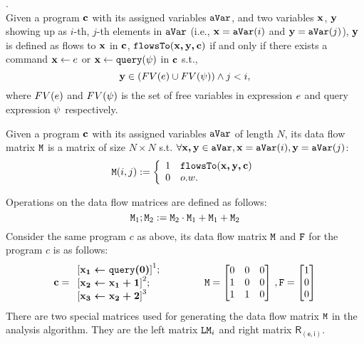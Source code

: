 \documentclass[a4paper,11pt]{article}
\begin{document}
\begin{defn}.
\\
Given a program  ${\boldsymbol{\mathbf{c}}}$ with its assigned variables $\mathtt{aVar}$,
and two variables ${\boldsymbol{\mathbf{x}}}$, ${\boldsymbol{\mathbf{y}}}$ showing up as $i$-th, $j$-th elements in $\mathtt{aVar}$ 
(i.e., ${\boldsymbol{\mathbf{x}}} = \mathtt{aVar}(i)$ and ${\boldsymbol{\mathbf{y}}} = \mathtt{aVar}(j)$),
${\boldsymbol{\mathbf{y}}}$ is defined as flows to ${\boldsymbol{\mathbf{x}}}$ in ${\boldsymbol{\mathbf{c}}}$, $\mathtt{flowsTo}({\boldsymbol{\mathbf{x, y, c}}})$ if and only if 
there exists
a command $\mathrel{ {\boldsymbol{\mathbf{x}}} \leftarrow e }$ or $\mathrel{ {\boldsymbol{\mathbf{x}}} \leftarrow {\tt query}(\psi) }$ in ${\boldsymbol{\mathbf{c}}}$ s.t.,
\[
	{\boldsymbol{\mathbf{y}}} \in (FV(e) \cup FV(\psi)) \land j < i,
\]
where $FV(e)$ and $FV(\psi)$ is the set of free variables in 
expression $e$ and query expression $\psi$ respectively.
\end{defn}
%
%
\begin{defn}
Given a program  ${\boldsymbol{\mathbf{c}}}$ with its assigned variables $\mathtt{aVar}$ of length $N$,
its data flow matrix $\mathtt{M}$ is a matrix of size $N \times N$ s.t.
$\forall {\boldsymbol{\mathbf{x, y}}} \in \mathtt{aVar}, {\boldsymbol{\mathbf{x}}} = \mathtt{aVar}(i), {\boldsymbol{\mathbf{y}}} = \mathtt{aVar}(j)$:
%
\[
\Mtrix(i, j) :=
\left\{
\begin{array}{ll}
1	&	\flowsto(\ssa{x, y, c}) \\
0	& o.w.
\end{array}
\right.
\]
%
\end{defn}
%
Operations on the data flow matrices are defined as follows:
%
\begin{equation}
\mathtt{M}_1 ; \mathtt{M}_2 
:= \mathtt{M}_2 \cdot \mathtt{M}_1 + \mathtt{M}_1 + \mathtt{M}_2
\end{equation}
%
Consider the same program $c$ as above, its data flow matrix $\mathtt{M}$ and $\mathtt{F}$ for the program $c$ is as follows:
$$
\ssa{c} = 
\begin{array}{l}
\left[\ssa{\assign {x_1} {\query(0)}}	\right]^1;
\\
\left[\ssa{\assign {x_2} {x_1 + 1}}		\right]^2;
\\
\left[\ssa{\assign {x_3} {x_2 + 2}}		\right]^3
\end{array}
~~~~~~~~~~~~
\Mtrix
=  \left[ 
\begin{matrix}
 0 & 0 & 0 \\
 1 & 0 & 0 \\
 1 & 1 & 0 \\
\end{matrix} \right] ~ , 
\flag = \left [ \begin{matrix}
1 \\
0 \\
0 \\
\end{matrix} \right ]
$$
%
There are two special matrices used for generating the data flow matrix $\mathtt{M}$ in the analysis algorithm. They are the left matrix $\mathtt{LM}_i$ and right matrix $\mathsf{R_{(e, i)}}$.
\end{document}
